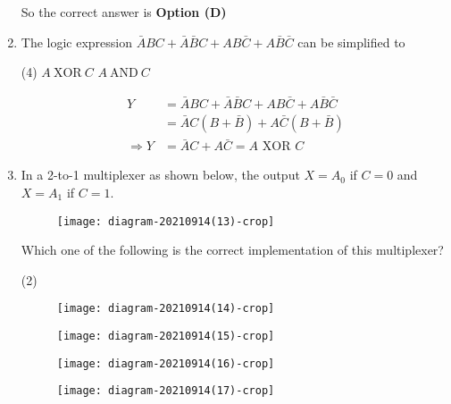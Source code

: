 \begin{enumerate}
\begin{tasks}
\end{tasks}
\begin{answer}
So the correct answer is \textbf{Option (D)}
\end{answer}
	\item The logic expression $\bar{A} B C+\bar{A} \bar{B} C+A B \bar{C}+A \bar{B} \bar{C}$ can be simplified to
{	}
\begin{tasks}(4)
\task[\textbf{A.}] $A\  \mathrm{XOR} \ C$
\task[\textbf{B.}] $A \ \mathrm{AND} \ C$
\end{tasks}
\begin{answer}
\begin{align*}
Y&=\bar{A} B C+\bar{A} \bar{B} C+A B \bar{C}+A \bar{B} \bar{C}\\&=\bar{A} C(B+\bar{B})+A \bar{C}(B+\bar{B})\\
\Rightarrow Y&=\bar{A} C+A \bar{C}=A\text{ XOR }C
\end{align*}
\end{answer}
	\item In a 2-to-1 multiplexer as shown below, the output $X=A_{0}$ if $C=0$ and $X=A_{1}$ if $C=1$.\\
	\begin{figure}[H]
		\centering
		\texttt{[image: diagram-20210914(13)-crop]}
	\end{figure}
	Which one of the following is the correct implementation of this multiplexer?
{	}
\begin{tasks}(2)
\task[\textbf{A.}] \begin{figure}[H]
	\centering
	\texttt{[image: diagram-20210914(14)-crop]}
\end{figure}
\task[\textbf{B.}] \begin{figure}[H]
	\centering
	\texttt{[image: diagram-20210914(15)-crop]}
\end{figure}
\task[\textbf{C.}]\begin{figure}[H]
	\centering
	\texttt{[image: diagram-20210914(16)-crop]}
\end{figure}
\task[\textbf{D.}] \begin{figure}[H]
	\centering
	\texttt{[image: diagram-20210914(17)-crop]}
\end{figure}
\end{tasks}
\begin{answer}

\end{answer}
\end{enumerate}
